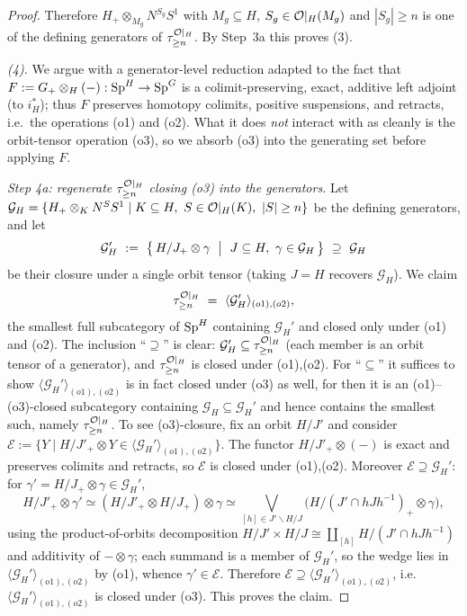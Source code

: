 \begin{proof}
Therefore $H_+\otimes_{M_g}N^{S_g}S^1$ with $M_g\subseteq H$, $S_g\in\mathcal{O}|_H(M_g)$
and $|S_g|\ge n$ is one of the defining generators of $\tau^{\mathcal{O}|_H}_{\ge n}$.
By Step~3a this proves (3).

\emph{(4).} We argue with a generator-level reduction adapted to the fact that
$F:=G_+\otimes_H(-):\mathrm{Sp}^H\to\mathrm{Sp}^G$ is a colimit-preserving, exact, additive
left adjoint (to $i_H^\ast$); thus $F$ preserves homotopy colimits, positive
suspensions, and retracts, i.e.\ the operations (o1) and (o2). What it does
\emph{not} interact with as cleanly is the orbit-tensor operation (o3), so we
absorb (o3) into the generating set before applying $F$.

\emph{Step 4a: regenerate $\tau^{\mathcal{O}|_H}_{\ge n}$ closing (o3) into the
generators.} Let $\mathcal G_H=\{H_+\otimes_K N^S S^1\mid K\subseteq H,\
S\in\mathcal{O}|_H(K),\ |S|\ge n\}$ be the defining generators, and let
\[
\mathcal G_H'\ :=\ \bigl\{\,H/J_+\otimes\gamma\ \bigm|\ J\subseteq H,\ \gamma\in\mathcal G_H\,\bigr\}\ \supseteq\ \mathcal G_H
\]
be their closure under a single orbit tensor (taking $J=H$ recovers
$\mathcal G_H$). We claim
\[
\tau^{\qfiveaO|_H}_{\ge n}\ =\ \langle\mathcal G_H'\rangle_{(o1),(o2)},
\]
the smallest full subcategory of $\mathrm{Sp}^H$ containing $\mathcal G_H'$ and closed
only under (o1) and (o2). The inclusion ``$\supseteq$'' is clear:
$\mathcal G_H'\subseteq\tau^{\mathcal{O}|_H}_{\ge n}$ (each member is an orbit tensor of a
generator), and $\tau^{\mathcal{O}|_H}_{\ge n}$ is closed under (o1),(o2). For
``$\subseteq$'' it suffices to show $\langle\mathcal G_H'\rangle_{(o1),(o2)}$ is in
fact closed under (o3) as well, for then it is an (o1)--(o3)-closed subcategory
containing $\mathcal G_H\subseteq\mathcal G_H'$ and hence contains the smallest such,
namely $\tau^{\mathcal{O}|_H}_{\ge n}$. To see (o3)-closure, fix an orbit $H/J'$ and
consider $\mathcal E:=\{Y\mid H/J'_+\otimes Y\in\langle\mathcal G_H'\rangle_{(o1),(o2)}\}$.
The functor $H/J'_+\otimes(-)$ is exact and preserves colimits and retracts, so
$\mathcal E$ is closed under (o1),(o2). Moreover $\mathcal E\supseteq\mathcal G_H'$:
for $\gamma'=H/J_+\otimes\gamma\in\mathcal G_H'$,
\[
H/J'_+\otimes\gamma'\simeq(H/J'_+\otimes H/J_+)\otimes\gamma
\simeq\bigvee_{[h]\in J'\backslash H/J}\bigl(H/(J'\cap hJh^{-1})_+\otimes\gamma\bigr),
\]
using the product-of-orbits decomposition $H/J'\times H/J\cong\coprod_{[h]}H/(J'\cap hJh^{-1})$
and additivity of $-\otimes\gamma$; each summand is a member of $\mathcal G_H'$, so
the wedge lies in $\langle\mathcal G_H'\rangle_{(o1),(o2)}$ by (o1), whence
$\gamma'\in\mathcal E$. Therefore $\mathcal E\supseteq\langle\mathcal G_H'\rangle_{(o1),(o2)}$,
i.e.\ $\langle\mathcal G_H'\rangle_{(o1),(o2)}$ is closed under (o3). This proves
the claim.


\end{proof}
